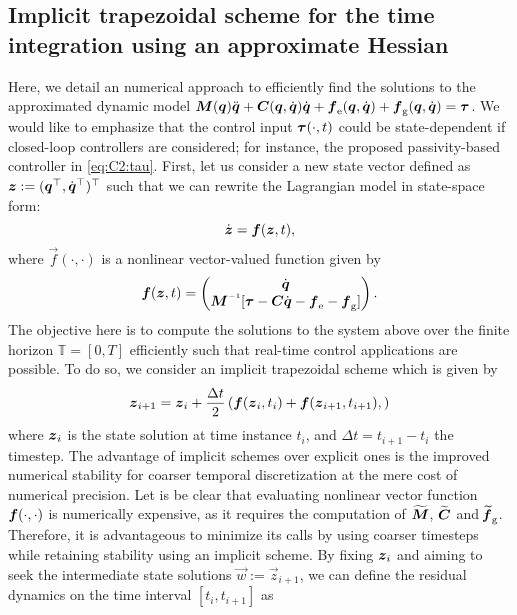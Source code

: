 \subsection{Implicit trapezoidal scheme for the time integration using an approximate Hessian}
\label{app:C2:timeint}
\noindent Here, we detail an numerical approach to efficiently find the solutions to the approximated dynamic model ${\boldsymbol{M}}({\boldsymbol{q}}){\ddot{\boldsymbol{q}}} + {\boldsymbol{C}}({\boldsymbol{q}},{\dot{\boldsymbol{q}}}){\dot{\boldsymbol{q}}} + {\boldsymbol{f}}_{\scriptstyle\textrm{e}}({\boldsymbol{q}},{\dot{\boldsymbol{q}}}) +  {\boldsymbol{f}}_{\scriptstyle\textrm{g}}({\boldsymbol{q}},{\dot{\boldsymbol{q}}}) = \boldsymbol{\tau}$. We would like to emphasize that the control input $\boldsymbol{\tau}(\cdot,t)$ could be state-dependent if closed-loop controllers are considered; for instance, the proposed passivity-based controller in \eqref{eq:C2:tau}. First, let us consider a new state vector defined as $\boldsymbol{z} := ( {\boldsymbol{q}}^\top,{\dot{\boldsymbol{q}}}^\top )^\top$ such that we can rewrite the Lagrangian model in state-space form:
%
\begin{equation}
\dot{{\boldsymbol{z}}} = \boldsymbol{f}({\boldsymbol{z}},t),
\end{equation}
%
where $\vec{f}(\cdot,\cdot)$ is a nonlinear vector-valued function given by
%
\begin{equation}
\vec{f}(\zB,t) = \begin{pmatrix} \dq \\ \mat{M}\inv [\tauB - \CB\dq - \fB\elastic- \fB\grav] \end{pmatrix}.
\end{equation}
%
The objective here is to compute the solutions to the system above over the finite horizon $\mathbb{T} = [0,T]$ efficiently such that real-time control applications are possible. To do so, we consider an implicit trapezoidal scheme which is given by
%
\begin{equation}
{\boldsymbol{z}}_{i+1} = {\boldsymbol{z}}_{i} + \frac{\Delta t}{2} \left( {\boldsymbol{f}}({\boldsymbol{z}}_{i},t_{i}) + {\boldsymbol{f}}({\boldsymbol{z}}_{i+1},t_{i+1}),  \right)
\end{equation}
%
where ${\boldsymbol{z}}_{i}$ is the state solution at time instance $t_{i}$, and $\Delta t = t_{i+1} - t_{i}$ the timestep. The advantage of implicit schemes over explicit ones is the improved numerical stability for coarser temporal discretization at the mere cost of numerical precision. Let is be clear that evaluating nonlinear vector function ${\boldsymbol{f}}(\cdot,\cdot)$ is numerically expensive, as it requires the computation of $\widetilde{\boldsymbol{M}}$, $\widetilde{\boldsymbol{C}}$ and $\widetilde{\!\boldsymbol{{\boldsymbol{f}}}}_{\scriptstyle\textrm{g}}$. Therefore, it is advantageous to minimize its calls by using coarser timesteps while retaining stability using an implicit scheme. By fixing ${\boldsymbol{z}}_{i}$ and aiming to seek the intermediate state solutions $\vec{w}:=\vec{z}_{i+1}$, we can define the residual dynamics on the time interval $[t_{i}, t_{i+1}]$ as
